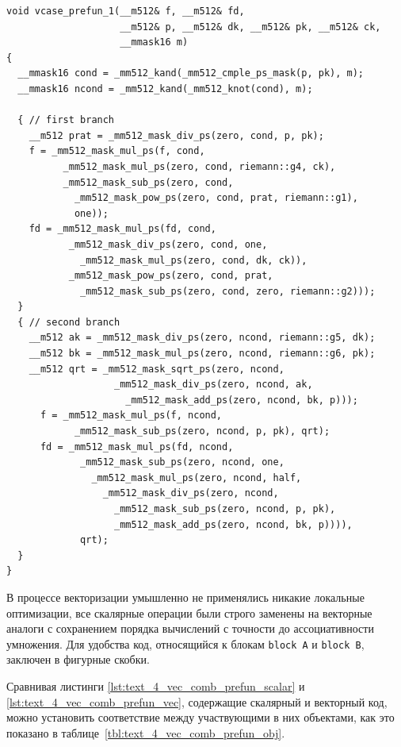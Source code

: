 \begin{lstlisting}[caption={Векторизованная версия функции \texttt{prefun} из состава римановского решателя.},label={lst:text_4_vec_comb_prefun_vec}]
void vcase_prefun_1(__m512& f, __m512& fd,
                    __m512& p, __m512& dk, __m512& pk, __m512& ck,
                    __mmask16 m)
{
  __mmask16 cond = _mm512_kand(_mm512_cmple_ps_mask(p, pk), m);
  __mmask16 ncond = _mm512_kand(_mm512_knot(cond), m);

  { // first branch
    __m512 prat = _mm512_mask_div_ps(zero, cond, p, pk);
    f = _mm512_mask_mul_ps(f, cond,
          _mm512_mask_mul_ps(zero, cond, riemann::g4, ck),
          _mm512_mask_sub_ps(zero, cond,
            _mm512_mask_pow_ps(zero, cond, prat, riemann::g1),
            one));
    fd = _mm512_mask_mul_ps(fd, cond,
           _mm512_mask_div_ps(zero, cond, one,
             _mm512_mask_mul_ps(zero, cond, dk, ck)),
           _mm512_mask_pow_ps(zero, cond, prat,
             _mm512_mask_sub_ps(zero, cond, zero, riemann::g2)));
  }
  { // second branch
    __m512 ak = _mm512_mask_div_ps(zero, ncond, riemann::g5, dk);
    __m512 bk = _mm512_mask_mul_ps(zero, ncond, riemann::g6, pk);
    __m512 qrt = _mm512_mask_sqrt_ps(zero, ncond,
                   _mm512_mask_div_ps(zero, ncond, ak,
                     _mm512_mask_add_ps(zero, ncond, bk, p)));
      f = _mm512_mask_mul_ps(f, ncond,
            _mm512_mask_sub_ps(zero, ncond, p, pk), qrt);
      fd = _mm512_mask_mul_ps(fd, ncond,
             _mm512_mask_sub_ps(zero, ncond, one,
               _mm512_mask_mul_ps(zero, ncond, half,
                 _mm512_mask_div_ps(zero, ncond,
                   _mm512_mask_sub_ps(zero, ncond, p, pk),
                   _mm512_mask_add_ps(zero, ncond, bk, p)))),
             qrt); 
  }
}                 
\end{lstlisting}

В процессе векторизации умышленно не применялись никакие локальные оптимизации, все скалярные операции были строго заменены на векторные аналоги с сохранением порядка вычислений с точности до ассоциативности умножения.
Для удобства код, относящийся к блокам \texttt{block A} и \texttt{block B}, заключен в фигурные скобки.

Сравнивая листинги \ref{lst:text_4_vec_comb_prefun_scalar} и \ref{lst:text_4_vec_comb_prefun_vec}, содержащие скалярный и векторный код, можно установить соответствие между участвующими в них объектами, как это показано в таблице~\ref{tbl:text_4_vec_comb_prefun_obj}.

